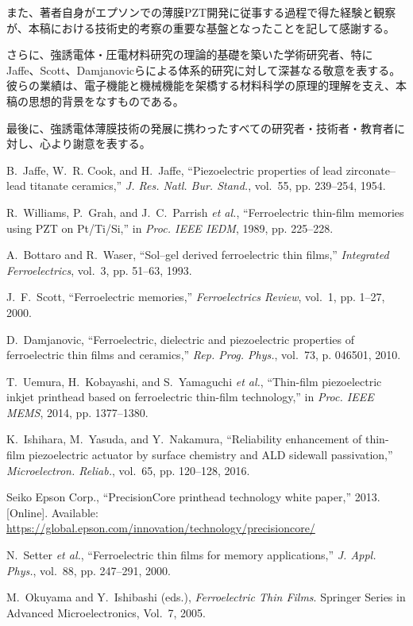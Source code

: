 \documentclass[conference]{IEEEtran}
\begin{document}
また、著者自身がエプソンでの薄膜PZT開発に従事する過程で得た経験と観察が、本稿における技術史的考察の重要な基盤となったことを記して感謝する。

さらに、強誘電体・圧電材料研究の理論的基礎を築いた学術研究者、特にJaffe、Scott、Damjanovicらによる体系的研究に対して深甚なる敬意を表する。彼らの業績は、電子機能と機械機能を架橋する材料科学の原理的理解を支え、本稿の思想的背景をなすものである。

最後に、強誘電体薄膜技術の発展に携わったすべての研究者・技術者・教育者に対し、心より謝意を表する。

\begin{thebibliography}{10}

B.~Jaffe, W.~R. Cook, and H.~Jaffe, ``Piezoelectric properties of lead zirconate--lead titanate ceramics,'' \emph{J. Res. Natl. Bur. Stand.}, vol.~55, pp. 239--254, 1954.

R.~Williams, P.~Grah, and J.~C.~Parrish \emph{et al.}, ``Ferroelectric thin-film memories using PZT on Pt/Ti/Si,'' in \emph{Proc. IEEE IEDM}, 1989, pp. 225--228.

A.~Bottaro and R.~Waser, ``Sol--gel derived ferroelectric thin films,'' \emph{Integrated Ferroelectrics}, vol.~3, pp. 51--63, 1993.

J.~F.~Scott, ``Ferroelectric memories,'' \emph{Ferroelectrics Review}, vol.~1, pp. 1--27, 2000.

D.~Damjanovic, ``Ferroelectric, dielectric and piezoelectric properties of ferroelectric thin films and ceramics,'' \emph{Rep. Prog. Phys.}, vol.~73, p. 046501, 2010.

T.~Uemura, H.~Kobayashi, and S.~Yamaguchi \emph{et al.}, ``Thin-film piezoelectric inkjet printhead based on ferroelectric thin-film technology,'' in \emph{Proc. IEEE MEMS}, 2014, pp. 1377--1380.

K.~Ishihara, M.~Yasuda, and Y.~Nakamura, ``Reliability enhancement of thin-film piezoelectric actuator by surface chemistry and ALD sidewall passivation,'' \emph{Microelectron. Reliab.}, vol.~65, pp. 120--128, 2016.

Seiko Epson Corp., ``PrecisionCore printhead technology white paper,'' 2013. [Online]. Available: \url{https://global.epson.com/innovation/technology/precisioncore/}

N.~Setter \emph{et al.}, ``Ferroelectric thin films for memory applications,'' \emph{J. Appl. Phys.}, vol.~88, pp. 247--291, 2000.

M.~Okuyama and Y.~Ishibashi (eds.), \emph{Ferroelectric Thin Films}. Springer Series in Advanced Microelectronics, Vol.~7, 2005.

\end{thebibliography}
\end{document}
